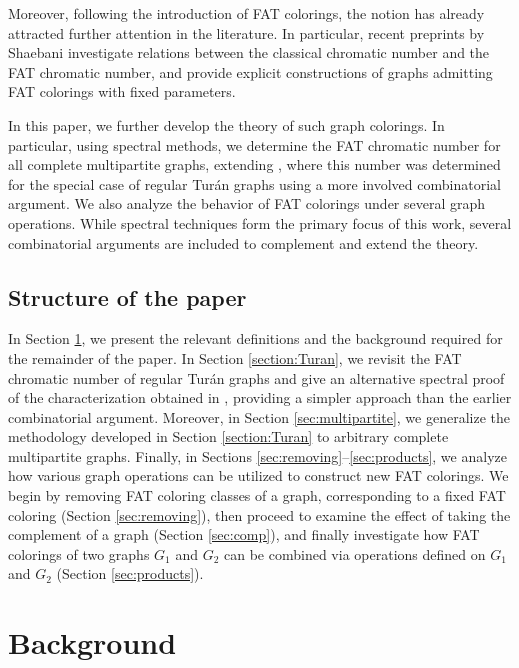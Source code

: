 \documentclass{article}
\theoremstyle{plain}
\theoremstyle{definition}
\theoremstyle{remark}
\begin{document}
Moreover, following the introduction of FAT colorings, the notion has already attracted further attention in the literature. In particular, recent preprints by Shaebani \cite{Shaebani1,Shaebani2} investigate relations between the classical chromatic number and the FAT chromatic number, and provide explicit constructions of graphs admitting FAT colorings with fixed parameters. \newline 

In this paper, we further develop the theory of such graph colorings. In particular, using spectral methods, we determine the FAT chromatic number for all complete multipartite graphs, extending \cite{beersmulasFAT}, where this number was determined for the special case of regular Turán graphs using a more involved combinatorial argument. We also analyze the behavior of FAT colorings under several graph operations. While spectral techniques form the primary focus of this work, several combinatorial arguments are included to complement and extend the theory.




\subsection*{Structure of the paper}
In Section \ref{sec:background}, we present the relevant definitions and the background required for the remainder of the paper. In Section \ref{section:Turan}, we revisit the FAT chromatic number of regular Turán graphs and give an alternative spectral proof of the characterization obtained in \cite{beersmulasFAT}, providing a simpler approach than the earlier combinatorial argument. Moreover,
in Section \ref{sec:multipartite}, we generalize the methodology developed in Section \ref{section:Turan} to arbitrary complete multipartite graphs. Finally, in Sections \ref{sec:removing}--\ref{sec:products}, we analyze how various graph operations can be utilized to construct new FAT colorings. We begin by removing FAT coloring classes of a graph, corresponding to a fixed FAT coloring (Section \ref{sec:removing}), then proceed to examine the effect of taking the complement of a graph (Section \ref{sec:comp}), and finally investigate how FAT colorings of two graphs $G_1$ and $G_2$ can be combined via operations defined on $G_1$ and $G_2$ (Section \ref{sec:products}).




\section{Background}\label{sec:background}
\end{document}
